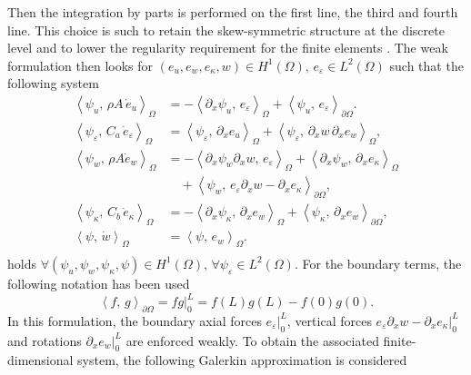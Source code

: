 \documentclass{ifacconf}
\newcommand{\inner}[3][]{\ensuremath{\left\langle #2, \, #3 \right\rangle_{#1}}}
\begin{document}
Then the integration by parts is performed on the first line, the third and fourth line. This choice is such to retain the skew-symmetric structure at the discrete level and to lower the regularity requirement for the finite elements \cite[Chap. 8]{brugnoli2020thesis}. The weak formulation then looks for $(e_u, e_w, e_\kappa, w) \in H^1(\Omega), \, e_\varepsilon \in L^2(\Omega)$
such that the following system
\begin{equation}\label{eq:weak_form}
	\begin{aligned}
		\inner[\Omega]{\psi_u}{\rho A \, \dot{e}_u} &= -\inner[\Omega]{\partial_x \psi_u}{ e_\varepsilon} +  \inner[\partial\Omega]{\psi_u}{e_\varepsilon}. \\
		\inner[\Omega]{\psi_\varepsilon}{C_a \, \dot{e}_\varepsilon} &= \inner[\Omega]{\psi_\varepsilon}{\partial_x e_u} + \inner[\Omega]{\psi_\varepsilon}{\partial_x w \, \partial_x e_w}, \\
		\inner[\Omega]{\psi_w}{\rho A\dot{e}_w} &= -\inner[\Omega]{\partial_x \psi_w \partial_x w}{e_\varepsilon} + \inner[\Omega]{\partial_{x} \psi_w}{\partial_{x} e_\kappa} \\
		&\quad +\inner[\partial\Omega]{\psi_w}{e_\varepsilon \partial_x w - \partial_x e_\kappa}, \\
		\inner[\Omega]{\psi_\kappa}{C_b \, \dot{e}_\kappa} &= - \inner[\Omega]{\partial_{x} \psi_\kappa}{\partial_{x} e_w} + \inner[\partial\Omega]{\psi_\kappa}{\partial_x e_w}, \\
		\inner[\Omega]{\psi}{\dot{w}} &= \inner[\Omega]{\psi}{e_w}. \\
	\end{aligned}
\end{equation}
holds $\forall (\psi_u, \psi_w, \psi_\kappa, \psi) \in H^1(\Omega), \, \forall \psi_\varepsilon \in L^2(\Omega)$. For the boundary terms, the following notation has been used
\begin{equation*}
	\inner[\partial\Omega]{f}{g} = f g \vert_{0}^L = f(L)g(L) - f(0)g(0).
\end{equation*} 
In this formulation, the boundary axial forces $e_\varepsilon\vert_{0}^L$, vertical forces $e_\varepsilon\partial_x w - \partial_x e_\kappa\vert_{0}^L$ and  rotations $\partial_x e_w\vert_{0}^L$ are enforced weakly. To obtain the associated finite-dimensional system, the following Galerkin approximation is considered 
\end{document}
